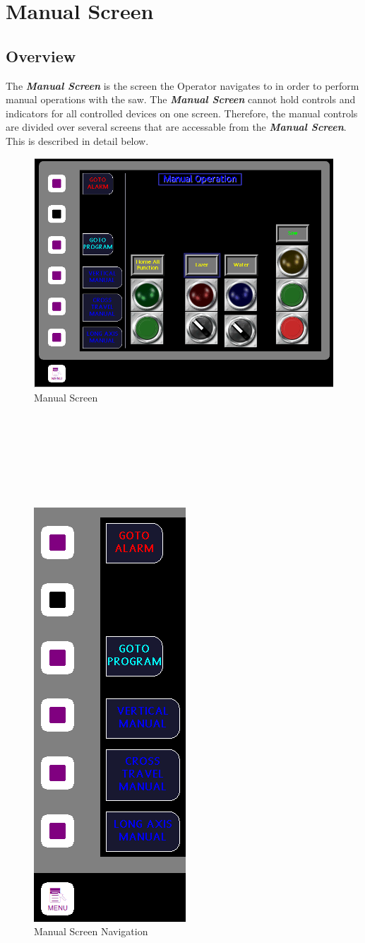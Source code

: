 \chapter{Manual Screen}
\section{Overview} The \textbf{\textit{Manual Screen}} is the screen the Operator navigates to in order to perform manual operations with the saw. The \textbf{\textit{Manual Screen}} cannot hold controls and indicators for all controlled devices on one screen. Therefore, the manual controls are divided over several screens that are accessable from the \textbf{\textit{Manual Screen}}. This is described in detail below.
\begin{figure}
	\centering
	\includegraphics[width=0.5
	\linewidth]{screen-captures/manual}
	\caption{Manual Screen}
	\label{fig:manual-screen}
\end{figure}
\\
\\
\\
\\
\\
\\
\pagebreak
\begin{figure}
	\centering
	\includegraphics[width=.3\linewidth]{screen-captures/manual-nav}
	\caption{Manual Screen Navigation}
	\label{fig:manual-nav}
\end{figure}
